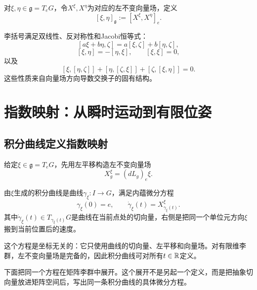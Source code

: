 \begin{definition}[李代数层面的李括号]
对$\xi,\eta\in\mathfrak g=T_eG$，令$X^\xi,X^\eta$为对应的左不变向量场，定义
\[
    [\xi,\eta]_{\mathfrak g}:=[X^\xi,X^\eta]_e.
\]
\end{definition}

\begin{theorem}[李代数公理]
李括号满足双线性、反对称性和Jacobi恒等式：
\[
    [a\xi+b\eta,\zeta]
    =a[\xi,\zeta]+b[\eta,\zeta],
\]
\[
    [\xi,\eta]=-[\eta,\xi],
    \qquad
    [\xi,\xi]=0,
\]
以及
\[
    [\xi,[\eta,\zeta]]
    +[\eta,[\zeta,\xi]]
    +[\zeta,[\xi,\eta]]=0.
\]
这些性质来自向量场方向导数交换子的固有结构。
\end{theorem}


\section{指数映射：从瞬时运动到有限位姿}

\subsection{积分曲线定义指数映射}

给定$\xi\in\mathfrak g=T_eG$，先用左平移构造左不变向量场
\[
    X^\xi_g=(dL_g)_e\xi.
\]

\begin{definition}[积分曲线]
由$\xi$生成的积分曲线是曲线$\gamma_\xi:I\to G$，满足内蕴微分方程
\[
    \gamma_\xi(0)=e,
    \qquad
    \dot\gamma_\xi(t)=X^\xi_{\gamma_\xi(t)}.
\]
其中$\dot\gamma_\xi(t)\in T_{\gamma_\xi(t)}G$是曲线在当前点处的切向量，右侧是把同一个单位元方向$\xi$搬到当前位置后的速度。
\end{definition}

这个方程是坐标无关的：它只使用曲线的切向量、左平移和向量场。对有限维李群，左不变向量场是完备的，因此积分曲线可对所有$t\in\mathbb{R}$定义。

下面把同一个方程在矩阵李群中展开。这个展开不是另起一个定义，而是把抽象切向量放进矩阵空间后，写出同一条积分曲线的具体微分方程。


